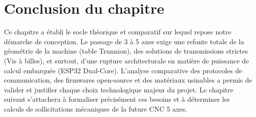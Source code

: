 \begin{table}[htbp]
\centering
\renewcommand{\arraystretch}{1.3}
\caption{Paramètres d'usinabilité et vitesses de coupe pour les matériaux testables avec notre CNC}
\label{tab:usinabilite}
\end{table}

\section{Conclusion du chapitre}

Ce chapitre a établi le socle théorique et comparatif sur lequel repose notre démarche de conception. Le passage de 3 à 5 axes exige une refonte totale de la géométrie de la machine (table Trunnion), des solutions de transmissions strictes (Vis à billes), et surtout, d'une rupture architecturale en matière de puissance de calcul embarquée (ESP32 Dual-Core). L'analyse comparative des protocoles de communication, des firmwares open-source et des matériaux usinables a permis de valider et justifier chaque choix technologique majeur du projet. Le chapitre suivant s'attachera à formaliser précisément ces besoins et à déterminer les calculs de sollicitations mécaniques de la future CNC 5 axes.
